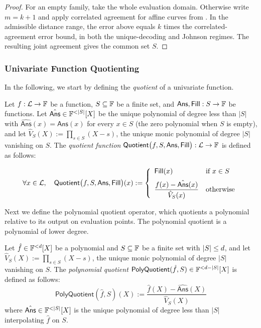 \begin{proof}
\leanok
For an empty family, take the whole evaluation domain. Otherwise write $m=k+1$ and apply
correlated agreement for affine curves from \cite{BCIKS20}. In the admissible distance range,
the error above equals $k$ times the correlated-agreement error bound, in both the unique-decoding
and Johnson regimes. The resulting joint agreement gives the common set $S$.
\end{proof}

\subsubsection{Univariate Function Quotienting}\label{sec:quotienting}

In the following, we start by defining the \emph{quotient} of a univariate function.
\begin{definition}\label{def:quotient}
\leanok
    Let $f:\mathcal{L}\to\mathbb{F}$ be a function, $S\subseteq\mathbb{F}$ be a finite set, and $\mathsf{Ans},\mathsf{Fill}: S\rightarrow\mathbb{F}$ be functions. Let $\hat{\mathsf{Ans}}\in\field^{<|S|}[X]$ be the unique polynomial of degree less than $|S|$ with $\hat{\mathsf{Ans}}(x)=\mathsf{Ans}(x)$ for every $x\in S$ (the zero polynomial when $S$ is empty), and let $\hat{V}_S(X):=\prod_{s\in S}(X-s)$, the unique monic polynomial of degree $|S|$ vanishing on $S$.
    The \emph{quotient function} $\mathsf{Quotient}\bigl(f,S,\mathsf{Ans},\mathsf{Fill}\bigr): \mathcal{L}\to\mathbb{F}$
    is defined as follows:

    \[
    \forall x \in \mathcal{L}, \quad
    \mathsf{Quotient}\bigl(f, S, \mathsf{Ans}, \mathsf{Fill} \bigr)(x)
    :=
    \left\{
    \begin{array}{ll}
        \mathsf{Fill}(x)
        & \text{if } x \in S \\[6pt]
        \dfrac{f(x) - \hat{\mathsf{Ans}}(x)}{\hat{V}_S(x)}
        & \text{otherwise}
    \end{array}
    \right.
    \]

\end{definition}

Next we define the polynomial quotient operator, which quotients a polynomial relative to its output on evaluation points. The polynomial quotient is a polynomial of lower degree.

\begin{definition}\label{def:poly_quotient}
\leanok
    Let $\hat{f}\in\mathbb{F}^{<d}[X]$ be a polynomial and $S\subseteq\mathbb{F}$ be a finite set with $|S|\le d$, and let $\hat{V}_S(X):=\prod_{s\in S}(X-s)$, the unique monic polynomial of degree $|S|$ vanishing on $S$. The \emph{polynomial quotient} $\mathsf{PolyQuotient}(\hat{f},S)\in\mathbb{F}^{<d-|S|}[X]$ is defined as follows:
    \[
            \mathsf{PolyQuotient}(\hat{f},S)(X):=\frac{\hat{f}(X)-\hat{\mathsf{Ans}}(X)}{\hat{V}_S(X)}
    \]
where $\hat{\mathsf{Ans}}\in\field^{<|S|}[X]$ is the unique polynomial of degree less than $|S|$ interpolating $\hat{f}$ on $S$.
\end{definition}

